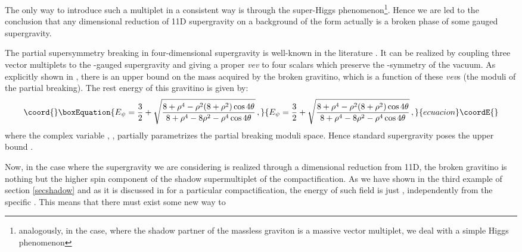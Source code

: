 \documentclass[a4paper,11pt]{article}
\begin{document}
The only way to introduce such a multiplet in a consistent way is
through the super-Higgs phenomenon\footnote{analogously, in the
\coordHE{} case, where the shadow partner of the massless
graviton is a massive vector multiplet, we deal with a simple
Higgs phenomenon}. Hence we are led to the conclusion that any
\coordHE{} dimensional reduction of 11D supergravity on a
background of the form \coordHE{} actually is a
broken phase of some gauged \coordHE{} supergravity.
\par
The \coordHE{} partial supersymmetry breaking in
four-dimensional supergravity is well-known in the literature
\cite{wageman}. It can be realized by coupling three vector
multiplets to the \coordHE{}-gauged \coordHE{} supergravity and
giving a proper {\it vev} to four scalars which preserve the
\coordHE{}  \coordHE{}-symmetry of the \coordHE{} vacuum. As explicitly
shown in \cite{noi}, there is an upper bound on the mass acquired
by the broken gravitino, which is a function of these {\it vev}s
(the moduli of the partial breaking). The rest energy of this
gravitino is given by:
\begin{equation}\coord{}\boxEquation{
  E_{\psi}=\frac{3}{2}+\sqrt{\frac{8+\rho^4
  -\rho^2 (8+\rho^2)\cos 4 \theta}
  {8+\rho^4-8\rho^2-\rho^4\cos 4 \theta}}\,,
}{
  E_{\psi}=\frac{3}{2}+\sqrt{\frac{8+\rho^4
  -\rho^2 (8+\rho^2)\cos 4 \theta}
  {8+\rho^4-8\rho^2-\rho^4\cos 4 \theta}}\,,
}{ecuacion}\coordE{}\end{equation}
where the complex variable \coordHE{}, \coordHE{}, partially
parametrizes the partial breaking moduli space. Hence standard
\coordHE{} supergravity poses the upper bound \coordHE{}.
\par
Now, in the case where the supergravity we are considering is
realized through a dimensional reduction from 11D, the broken
gravitino is nothing but the higher spin component of the shadow
supermultiplet of the compactification. As we have shown in the
third example of section \ref{secshadow} and as it is discussed in
\cite{N010} for a particular compactification, the energy of such
field is just \coordHE{}, independently from the specific
\coordHE{}. This means that there must exist some new way to
\end{document}
